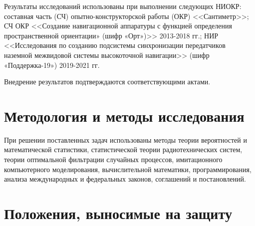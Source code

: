 Результаты исследований использованы при выполнении следующих НИОКР: 
составная часть (СЧ) опытно-конструкторской работы (ОКР) <<Сантиметр>>;
СЧ ОКР <<Создание навигационной аппаратуры с функцией определения пространственной ориентации» (шифр «Орт»)>> 2013-2018 гг.; 
НИР <<Исследования по созданию подсистемы синхронизации передатчиков наземной межвидовой системы высокоточной навигации>> (шифр «Поддержка-19») 2019-2021 гг.

Внедрение результатов подтверждаются соответствующими актами.





\section*{Методология и методы исследования}

При решении поставленных задач использованы методы теории вероятностей и математической статистики, статистической теории радиотехнических систем, теории оптимальной фильтрации случайных процессов, имитационного компьютерного моделирования, вычислительной математики, программирования, анализа международных и федеральных законов, соглашений и постановлений.


\section*{Положения, выносимые на защиту}

